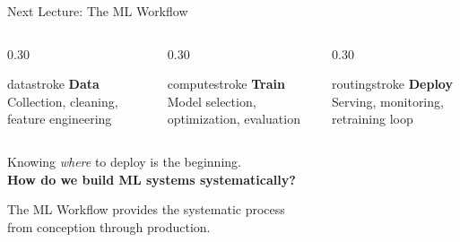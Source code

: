 \documentclass[aspectratio=169, 12pt]{beamer}
\begin{document}
\begin{frame}{Next Lecture: The ML Workflow}
\note{
%
%
%
}

\small
\centering
\vspace{0.5cm}

\begin{columns}[c]
  \begin{column}{0.30\textwidth}
    \centering
    \begin{mlsyscard}{datastroke}
    {\normalsize\bfseries Data}\\[0.1cm]
    {\footnotesize Collection, cleaning, feature engineering}
    \end{mlsyscard}
  \end{column}
  \begin{column}{0.30\textwidth}
    \centering
    \begin{mlsyscard}{computestroke}
    {\normalsize\bfseries Train}\\[0.1cm]
    {\footnotesize Model selection, optimization, evaluation}
    \end{mlsyscard}
  \end{column}
  \begin{column}{0.30\textwidth}
    \centering
    \begin{mlsyscard}{routingstroke}
    {\normalsize\bfseries Deploy}\\[0.1cm]
    {\footnotesize Serving, monitoring, retraining loop}
    \end{mlsyscard}
  \end{column}
\end{columns}

\vspace{0.4cm}
{\normalsize Knowing \emph{where} to deploy is the beginning.}\\[0.1cm]
{\normalsize\textbf{How do we build ML systems systematically?}}

\vspace{0.3cm}
{\small The ML Workflow provides the systematic process\\from conception through production.}

\end{frame}
\end{document}
